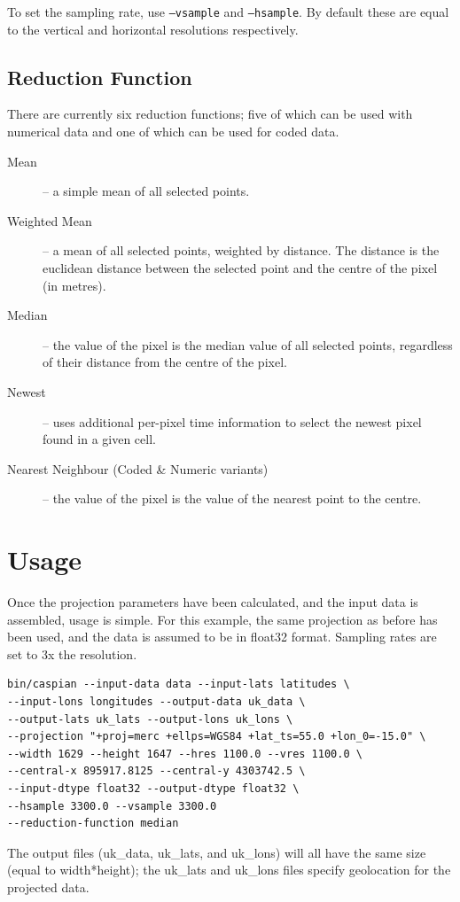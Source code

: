 \documentclass[a4paper,12pt]{article}
\begin{document}
To set the sampling rate, use \texttt{--vsample} and \texttt{--hsample}. By default these are equal to the vertical and horizontal resolutions respectively.

\subsection{Reduction Function}
There are currently six reduction functions; five of which can be used with numerical data and one of which can be used for coded data.
\begin{description}
\item[Mean] -- a simple mean of all selected points.
\item[Weighted Mean] -- a mean of all selected points, weighted by distance. The distance is the euclidean distance between the selected point and the centre of the pixel (in metres).
\item[Median] -- the value of the pixel is the median value of all selected points, regardless of their distance from the centre of the pixel.
\item[Newest] -- uses additional per-pixel time information to select the newest pixel found in a given cell.
\item[Nearest Neighbour (Coded \& Numeric variants)] -- the value of the pixel is the value of the nearest point to the centre.
\end{description}


\section{Usage}

Once the projection parameters have been calculated, and the input data is assembled, usage is simple. For this example, the same projection as before has been used, and the data is assumed to be in float32 format. Sampling rates are set to 3x the resolution.
\begin{verbatim}
bin/caspian --input-data data --input-lats latitudes \
--input-lons longitudes --output-data uk_data \
--output-lats uk_lats --output-lons uk_lons \
--projection "+proj=merc +ellps=WGS84 +lat_ts=55.0 +lon_0=-15.0" \
--width 1629 --height 1647 --hres 1100.0 --vres 1100.0 \
--central-x 895917.8125 --central-y 4303742.5 \
--input-dtype float32 --output-dtype float32 \
--hsample 3300.0 --vsample 3300.0
--reduction-function median
\end{verbatim}

The output files (uk\_data, uk\_lats, and uk\_lons) will all have the same size (equal to width*height); the uk\_lats and uk\_lons files specify geolocation for the projected data.
\end{document}
